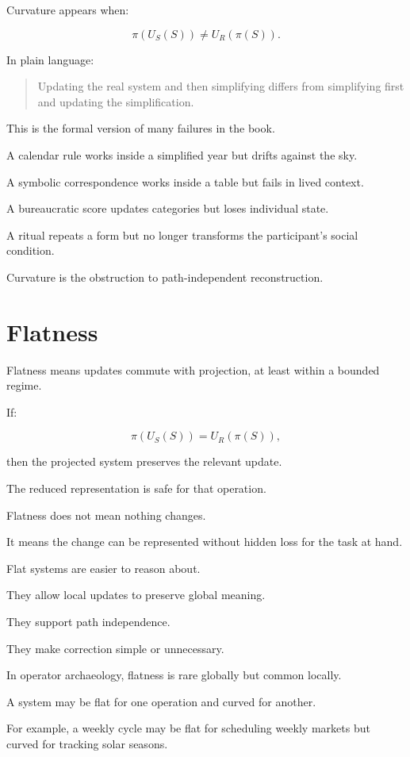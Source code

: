 \documentclass[11pt]{book}
\begin{document}
Curvature appears when:

\[
\pi(U_S(S)) \neq U_R(\pi(S)).
\]

In plain language:

\begin{quote}
Updating the real system and then simplifying differs from simplifying first and updating the simplification.
\end{quote}

This is the formal version of many failures in the book.

A calendar rule works inside a simplified year but drifts against the sky.

A symbolic correspondence works inside a table but fails in lived context.

A bureaucratic score updates categories but loses individual state.

A ritual repeats a form but no longer transforms the participant's social condition.

Curvature is the obstruction to path-independent reconstruction.

\section{Flatness}

Flatness means updates commute with projection, at least within a bounded regime.

If:

\[
\pi(U_S(S)) = U_R(\pi(S)),
\]

then the projected system preserves the relevant update.

The reduced representation is safe for that operation.

Flatness does not mean nothing changes.

It means the change can be represented without hidden loss for the task at hand.

Flat systems are easier to reason about.

They allow local updates to preserve global meaning.

They support path independence.

They make correction simple or unnecessary.

In operator archaeology, flatness is rare globally but common locally.

A system may be flat for one operation and curved for another.

For example, a weekly cycle may be flat for scheduling weekly markets but curved for tracking solar seasons.
\end{document}
